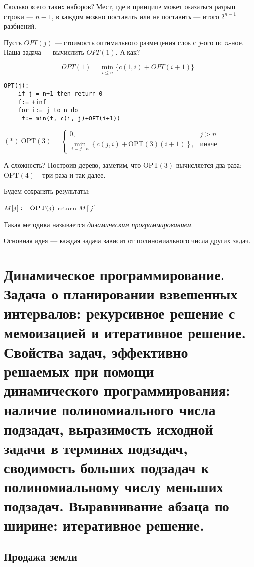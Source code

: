 \documentclass[a4paper,12pt]{article}
\begin{document}
Сколько всего таких наборов? Мест, где в принципе может оказаться разрып строки --- $n-1$, в каждом можно поставить или не поставить --- итого $2^{n-1}$ разбиений.

Пусть $OPT(j)$ --- стоимость оптимального размещения слов с $j$-ого по $n$-ное. Наша задача --- вычислить $OPT(1)$. А как?

\[
    OPT(1) = \min\limits_{i\leqslant n}\{c(1, i)+OPT(i+1)\}
\]

\begin{lstlisting}
OPT(j):
    if j = n+1 then return 0
    f:= +inf
    for i:= j to n do
     f:= min(f, c(i, j)+OPT(i+1))
\end{lstlisting}

$(*)\ \mathrm{OPT}(3) =\begin{cases}
    0, & j>n\\
    \min\limits_{i = j\ldots n}\left\{ c(j, i) + \mathrm{OPT}(3)(i+1) \right\}, & \text{иначе}
\end{cases}$

А сложность? Построив дерево, заметим, что $\mathrm{OPT}(3)$ вычисляется два раза; $\mathrm{OPT}(4)$ -- три раза и так далее.

Будем сохранять результаты:

\begin{algorithmic}
	\Else
		\State $M[j] \mathrel{:=} \textsc{OPT}(j)$
	\EndIf
	\State return $M[j]$
	\EndFunction
\end{algorithmic}

Такая методика называется \emph{динамическим программированием}.

Основная идея --- каждая задача зависит от полиномиального числа других задач.
\newpage
\section{Динамическое программирование. Задача о планировании взвешенных интервалов: рекурсивное решение с мемоизацией и итеративное решение. Свойства задач, эффективно решаемых при помощи динамического программирования: наличие полиномиального числа подзадач, выразимость исходной задачи в терминах подзадач, сводимость больших подзадач к полиномиальному числу меньших подзадач. Выравнивание абзаца по ширине: итеративное решение.}

\subsection{Продажа земли}
\end{document}
